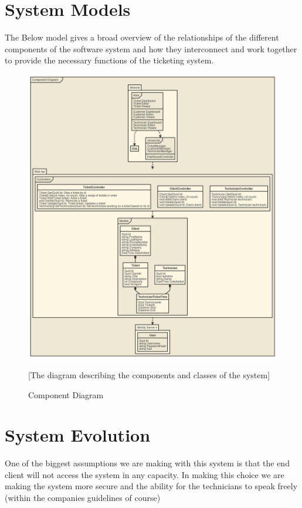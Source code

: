 \documentclass[letterpaper]{article}
\begin{document}
\section{System Models}
The Below model gives a broad overview of the relationships of the different components of the software system and how they interconnect and work together to provide the necessary functions of the ticketing system.
\begin{figure}[htbp]
  \includegraphics[scale =.33]{ComponentDiagram}
  \caption{Component Diagram}[The diagram describing the components and classes of the system]
  \centering
\end{figure}

\pagebreak

\section{System Evolution}
One of the biggest assumptions we are making with this system is that the end client will not access the system in any capacity. In making this choice we are making the system more secure and the ability for the technicians to speak freely (within the companies guidelines of course)
\end{document}

